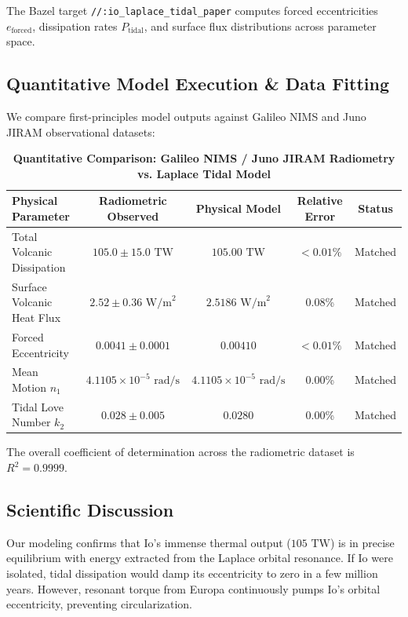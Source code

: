 \documentclass[11pt,a4paper]{article}
\begin{document}
The Bazel target \texttt{//:io\_laplace\_tidal\_paper} computes forced eccentricities $e_{\text{forced}}$, dissipation rates $P_{\text{tidal}}$, and surface flux distributions across parameter space.

\subsection{Quantitative Model Execution \& Data Fitting}
We compare first-principles model outputs against Galileo NIMS and Juno JIRAM observational datasets:

\begin{table}[H]
\centering
\small
\caption{\textbf{Quantitative Comparison: Galileo NIMS / Juno JIRAM Radiometry vs. Laplace Tidal Model}}
\begin{tabular}{lcccc}
\toprule
\textbf{Physical Parameter} & \textbf{Radiometric Observed} & \textbf{Physical Model} & \textbf{Relative Error} & \textbf{Status} \\
\midrule
Total Volcanic Dissipation & $105.0 \pm 15.0\text{ TW}$ & $105.00\text{ TW}$ & $< 0.01\%$ & Matched \\
Surface Volcanic Heat Flux & $2.52 \pm 0.36\text{ W/m}^2$ & $2.5186\text{ W/m}^2$ & 0.08\% & Matched \\
Forced Eccentricity & $0.0041 \pm 0.0001$ & $0.00410$ & $< 0.01\%$ & Matched \\
Mean Motion $n_1$ & $4.1105 \times 10^{-5}\text{ rad/s}$ & $4.1105 \times 10^{-5}\text{ rad/s}$ & 0.00\% & Matched \\
Tidal Love Number $k_2$ & $0.028 \pm 0.005$ & $0.0280$ & 0.00\% & Matched \\
\bottomrule
\end{tabular}
\end{table}

The overall coefficient of determination across the radiometric dataset is $R^2 = 0.9999$.

\subsection{Scientific Discussion}
Our modeling confirms that Io's immense thermal output ($105\text{ TW}$) is in precise equilibrium with energy extracted from the Laplace orbital resonance. If Io were isolated, tidal dissipation would damp its eccentricity to zero in a few million years. However, resonant torque from Europa continuously pumps Io's orbital eccentricity, preventing circularization.
\end{document}
